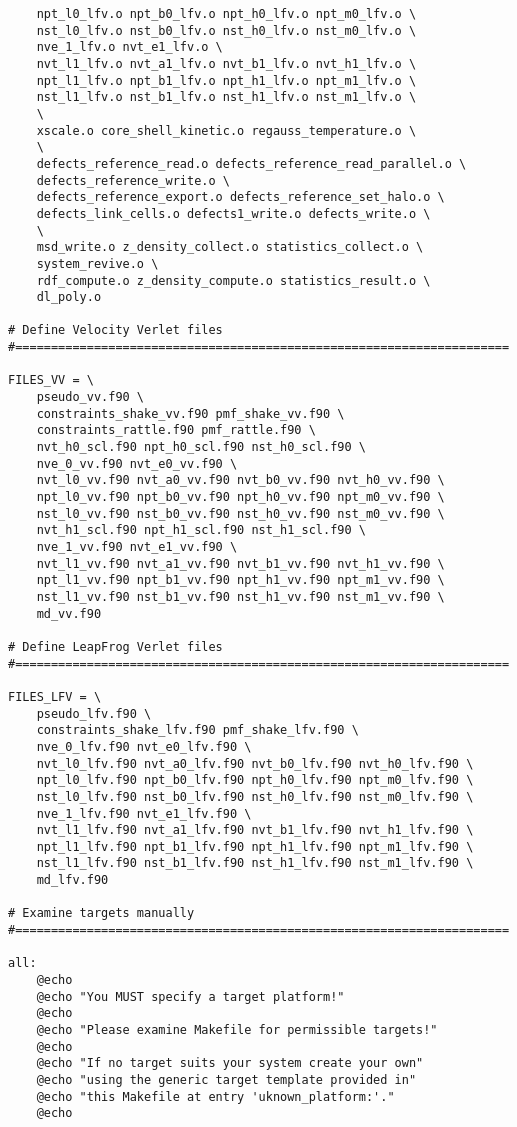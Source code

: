 \begin{verbatim}
	npt_l0_lfv.o npt_b0_lfv.o npt_h0_lfv.o npt_m0_lfv.o \
	nst_l0_lfv.o nst_b0_lfv.o nst_h0_lfv.o nst_m0_lfv.o \
	nve_1_lfv.o nvt_e1_lfv.o \
	nvt_l1_lfv.o nvt_a1_lfv.o nvt_b1_lfv.o nvt_h1_lfv.o \
	npt_l1_lfv.o npt_b1_lfv.o npt_h1_lfv.o npt_m1_lfv.o \
	nst_l1_lfv.o nst_b1_lfv.o nst_h1_lfv.o nst_m1_lfv.o \
	\
	xscale.o core_shell_kinetic.o regauss_temperature.o \
	\
	defects_reference_read.o defects_reference_read_parallel.o \
	defects_reference_write.o \
	defects_reference_export.o defects_reference_set_halo.o \
	defects_link_cells.o defects1_write.o defects_write.o \
	\
	msd_write.o z_density_collect.o statistics_collect.o \
	system_revive.o \
	rdf_compute.o z_density_compute.o statistics_result.o \
	dl_poly.o

# Define Velocity Verlet files
#=====================================================================

FILES_VV = \
	pseudo_vv.f90 \
	constraints_shake_vv.f90 pmf_shake_vv.f90 \
	constraints_rattle.f90 pmf_rattle.f90 \
	nvt_h0_scl.f90 npt_h0_scl.f90 nst_h0_scl.f90 \
	nve_0_vv.f90 nvt_e0_vv.f90 \
	nvt_l0_vv.f90 nvt_a0_vv.f90 nvt_b0_vv.f90 nvt_h0_vv.f90 \
	npt_l0_vv.f90 npt_b0_vv.f90 npt_h0_vv.f90 npt_m0_vv.f90 \
	nst_l0_vv.f90 nst_b0_vv.f90 nst_h0_vv.f90 nst_m0_vv.f90 \
	nvt_h1_scl.f90 npt_h1_scl.f90 nst_h1_scl.f90 \
	nve_1_vv.f90 nvt_e1_vv.f90 \
	nvt_l1_vv.f90 nvt_a1_vv.f90 nvt_b1_vv.f90 nvt_h1_vv.f90 \
	npt_l1_vv.f90 npt_b1_vv.f90 npt_h1_vv.f90 npt_m1_vv.f90 \
	nst_l1_vv.f90 nst_b1_vv.f90 nst_h1_vv.f90 nst_m1_vv.f90 \
	md_vv.f90

# Define LeapFrog Verlet files
#=====================================================================

FILES_LFV = \
	pseudo_lfv.f90 \
	constraints_shake_lfv.f90 pmf_shake_lfv.f90 \
	nve_0_lfv.f90 nvt_e0_lfv.f90 \
	nvt_l0_lfv.f90 nvt_a0_lfv.f90 nvt_b0_lfv.f90 nvt_h0_lfv.f90 \
	npt_l0_lfv.f90 npt_b0_lfv.f90 npt_h0_lfv.f90 npt_m0_lfv.f90 \
	nst_l0_lfv.f90 nst_b0_lfv.f90 nst_h0_lfv.f90 nst_m0_lfv.f90 \
	nve_1_lfv.f90 nvt_e1_lfv.f90 \
	nvt_l1_lfv.f90 nvt_a1_lfv.f90 nvt_b1_lfv.f90 nvt_h1_lfv.f90 \
	npt_l1_lfv.f90 npt_b1_lfv.f90 npt_h1_lfv.f90 npt_m1_lfv.f90 \
	nst_l1_lfv.f90 nst_b1_lfv.f90 nst_h1_lfv.f90 nst_m1_lfv.f90 \
	md_lfv.f90

# Examine targets manually
#=====================================================================

all:
	@echo
	@echo "You MUST specify a target platform!"
	@echo
	@echo "Please examine Makefile for permissible targets!"
	@echo
	@echo "If no target suits your system create your own"
	@echo "using the generic target template provided in"
	@echo "this Makefile at entry 'uknown_platform:'."
	@echo


\end{verbatim}
